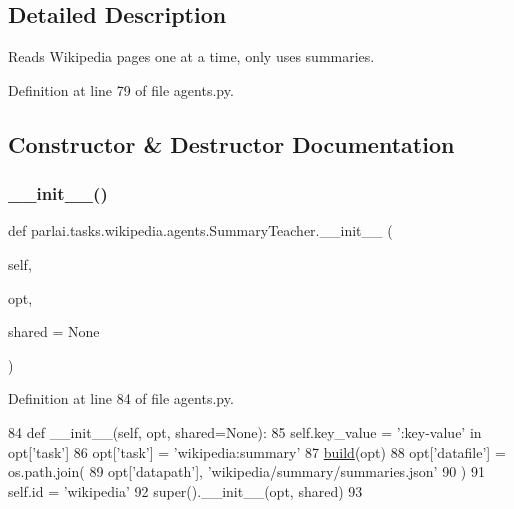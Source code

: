 \subsection{Detailed Description}
\begin{DoxyVerb}Reads Wikipedia pages one at a time, only uses summaries.
\end{DoxyVerb}
 

Definition at line 79 of file agents.\+py.



\subsection{Constructor \& Destructor Documentation}
\mbox{\label{classparlai_1_1tasks_1_1wikipedia_1_1agents_1_1SummaryTeacher_af6f404f1debdf8cb2c23dd52ae4acbb7}} 
\subsubsection{\texorpdfstring{\+\_\+\+\_\+init\+\_\+\+\_\+()}{\_\_init\_\_()}}
{\footnotesize\ttfamily def parlai.\+tasks.\+wikipedia.\+agents.\+Summary\+Teacher.\+\_\+\+\_\+init\+\_\+\+\_\+ (\begin{DoxyParamCaption}\item[{}]{self,  }\item[{}]{opt,  }\item[{}]{shared = {\ttfamily None} }\end{DoxyParamCaption})}



Definition at line 84 of file agents.\+py.


\begin{DoxyCode}
84     \textcolor{keyword}{def }\_\_init\_\_(self, opt, shared=None):
85         self.key\_value = \textcolor{stringliteral}{':key-value'} \textcolor{keywordflow}{in} opt[\textcolor{stringliteral}{'task'}]
86         opt[\textcolor{stringliteral}{'task'}] = \textcolor{stringliteral}{'wikipedia:summary'}
87         \hyperlink{namespaceparlai_1_1mturk_1_1tasks_1_1talkthewalk_1_1download_a8c0fbb9b6dfe127cb8c1bd6e7c4e33fd}{build}(opt)
88         opt[\textcolor{stringliteral}{'datafile'}] = os.path.join(
89             opt[\textcolor{stringliteral}{'datapath'}], \textcolor{stringliteral}{'wikipedia/summary/summaries.json'}
90         )
91         self.id = \textcolor{stringliteral}{'wikipedia'}
92         super().\_\_init\_\_(opt, shared)
93 
\end{DoxyCode}


